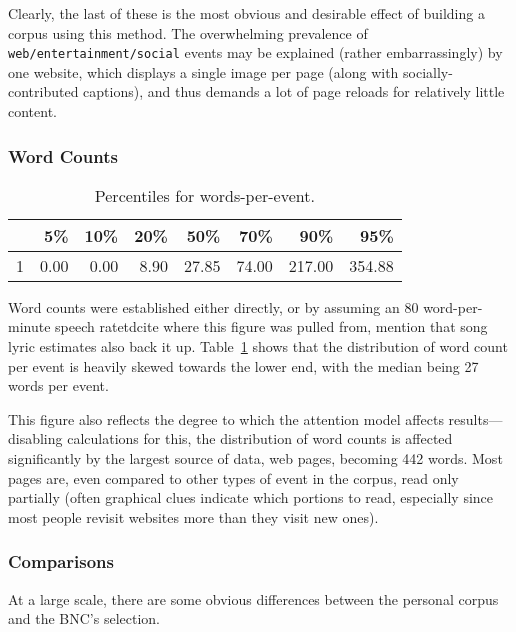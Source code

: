 Clearly, the last of these is the most obvious and desirable effect of building a corpus using this method.  The overwhelming prevalence of \texttt{web/entertainment/social} events may be explained (rather embarrassingly) by one website, which displays a single image per page (along with socially-contributed captions), and thus demands a lot of page reloads for relatively little content.





\subsubsection{Word Counts}

\begin{table}[ht]
\centering
\begin{tabular}{rrrrrrrr}
  \hline
 & 5\% & 10\% & 20\% & 50\% & 70\% & 90\% & 95\% \\ 
  \hline
1 & 0.00 & 0.00 & 8.90 & 27.85 & 74.00 & 217.00 & 354.88 \\ 
   \hline
\end{tabular}
\caption{Percentiles for words-per-event.}
\label{table:personal:wordsperevent}
\end{table}

Word counts were established either directly, or by assuming an 80 word-per-minute speech ratetd{cite where this figure was pulled from, mention that song lyric estimates also back it up}.  Table~\ref{table:personal:wordsperevent} shows that the distribution of word count per event is heavily skewed towards the lower end, with the median being 27 words per event.

This figure also reflects the degree to which the attention model affects results---disabling calculations for this, the distribution of word counts is affected significantly by the largest source of data, web pages, becoming 442 words.  Most pages are, even compared to other types of event in the corpus, read only partially (often graphical clues indicate which portions to read, especially since most people revisit websites more than they visit new ones).









\subsubsection{Comparisons}
At a large scale, there are some obvious differences between the personal corpus and the BNC's selection.

